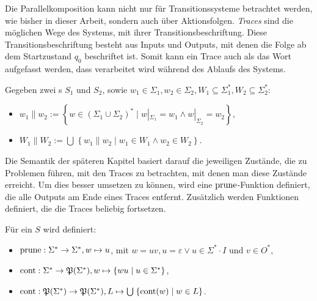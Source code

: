 Die Parallelkomposition kann nicht nur für Transitionssysteme betrachtet
werden, wie bisher in dieser Arbeit, sondern auch über Aktionsfolgen.
\emph{Traces} sind die möglichen Wege des Systems, mit ihrer
Transitionsbeschriftung. Diese Transitionsbeschriftung besteht aus Inputs und
Outputs, mit denen die Folge ab dem Startzustand $q_0$ beschriftet ist. Somit
kann ein Trace auch als das Wort aufgefasst werden, dass verarbeitet wird
während des Ablaufs des Systems.

\begin{Def}
  Gegeben zwei \EIO{}s $S_1$ und $S_2$, sowie $w_1\in\Sigma _1, w_2\in\Sigma
  _2, W_1\subseteq\Sigma _1^*, W_2\subseteq\Sigma _2^*$:
  \begin{itemize}
    \item $w_1\| w_2:=\left\{w\in (\Sigma _1\cup\Sigma _2)^*\mid w|_{\Sigma _1}=w_1\wedge
      w|_{\Sigma _2}=w_2\right\}$,
    \item $W_1\| W_2:=\bigcup\hspace{1pt}\left\{w_1\| w_2\mid w_1\in W_1\wedge
      w_2\in W_2\right\}$.
  \end{itemize}
\end{Def}

Die Semantik der späteren Kapitel basiert darauf die jeweiligen Zustände, die
zu Problemen führen, mit den Traces zu betrachten, mit denen man diese
Zustände erreicht. Um dies besser umsetzen zu können, wird eine
$\mathrm{prune}{}$-Funktion definiert, die alle Outputs am Ende eines Traces entfernt.
Zusätzlich werden Funktionen definiert, die die Traces beliebig fortsetzen.

\begin{Def}
  Für ein \EIO{} $S$ wird definiert:
  \begin{itemize}
    \item $\mathrm{prune}{}:\Sigma ^*\rightarrow\Sigma ^*, w\mapsto u$, mit $w=uv,
      u=\varepsilon\vee u\in\Sigma ^*\cdot I$ und $v\in O^*$,
    \item $\mathrm{cont}{}:\Sigma ^*\rightarrow\mathfrak{P}(\Sigma ^*),
      w\mapsto\left\{wu\mid u\in\Sigma ^*\right\}$,
    \item $\mathrm{cont}{}:\mathfrak{P}(\Sigma ^*)\rightarrow\mathfrak{P}(\Sigma ^*),
      L\mapsto\bigcup\hspace{1pt}\left\{\mathrm{cont}{}(w)\mid w\in L\right\}$.
  \end{itemize}
\end{Def}

